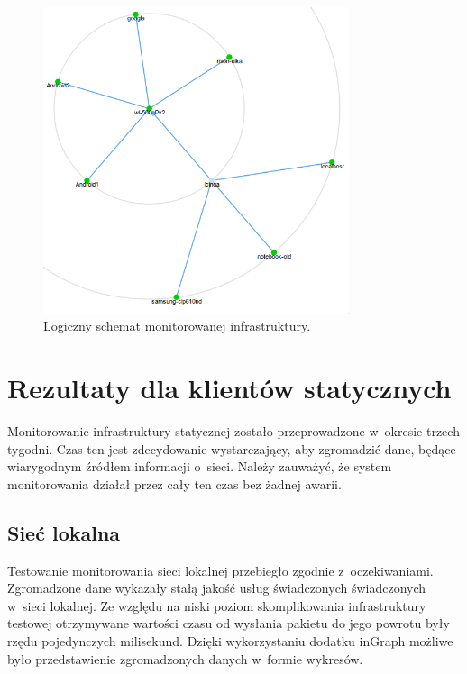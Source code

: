 \begin{figure}[ht]
  \caption{Logiczny schemat monitorowanej
    infrastruktury.}
  \label{fig:logicznySchematSieci}
  \centering
\includegraphics[width=0.8\textwidth]{img/logicznySchematSieci.png}
\end{figure}

\section[Klient statyczny][Rezultaty dla klientów statycznych]{Rezultaty dla klientów statycznych}

Monitorowanie infrastruktury statycznej zostało przeprowadzone
w~okresie trzech tygodni. Czas ten jest zdecydowanie wystarczający, aby
zgromadzić dane, będące wiarygodnym źródłem informacji o~sieci. Należy
zauważyć, że system monitorowania działał przez cały ten czas bez
żadnej awarii.

\subsection[Sieć lokalna][Sieć lokalna]{Sieć lokalna}

Testowanie monitorowania sieci lokalnej przebiegło zgodnie
z~oczekiwaniami. Zgromadzone dane wykazały stałą jakość usług
świadczonych świadczonych w~sieci lokalnej. Ze względu na niski poziom
skomplikowania infrastruktury testowej otrzymywane wartości czasu od
wysłania pakietu do jego powrotu były rzędu pojedynczych
milisekund. Dzięki wykorzystaniu dodatku inGraph możliwe było
przedstawienie zgromadzonych danych w~formie wykresów.

